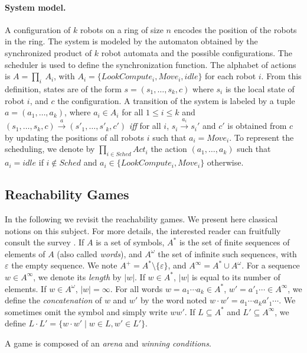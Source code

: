 \documentclass[envcountsame]{llncs} \usepackage[english]{babel}
\begin{document}
\paragraph {System model.}
A configuration of $k$ robots on a ring of size $n$ encodes the position of the robots in the ring.
The system is modeled by the automaton obtained
by the synchronized product of $k$ robot automata and the possible
configurations.   The scheduler
is used to define the synchronization function.   The alphabet of
actions is $A = {\prod_{i}}\ \mathit{A}_i$, with $A_i
= \{LookCompute_i, Move_i,idle\}$ for each robot $i$. From this definition, states
are of the form $s = (s_1,\dots,s_k,c)$ where $s_i$ is the local state
of robot $i$, and $c$ the configuration. A transition of the system is labeled by a tuple $a=(a_1, \ldots, a_k)$, where
$a_i \in A_i$ for all $1 \leq i \leq k$ and $(s_1,\dots,s_k,c) \xrightarrow{a}
(s'_1,\dots,s'_k,c')$ \textit{iff} for all $i$, $s_i \xrightarrow{a_i} s_i'$ and
$c'$ is obtained from $c$ by updating the positions of all robots $i$ such that
$a_i = Move_i$. To represent the scheduling, we denote by ${\prod_{i \in
\mathit{Sched}}} \mathit{Act}_i$ the action $(a_1, \ldots, a_k)$ such that $a_i
= idle$ if $i \notin Sched$ and $a_i \in \{LookCompute_i, Move_i\}$ otherwise.


\subsection{Reachability Games}
\label{sec:jeux}
In the following we revisit the reachability games. We present here classical notions on this subject.
For more details, the interested reader can fruitfully consult the survey \cite{DBLP:conf/dagstuhl/Mazala01}.
If $A$ is a set of symbols, $A^*$ is the set of finite sequences of elements of $A$ (also called \emph{words}), and $A^\omega$
the set of infinite such sequences, with $\varepsilon$ the empty sequence. We note $A^+=A^*\setminus \{\varepsilon\}$,
and $A^\infty=A^*\cup A^\omega$. For a sequence $w\in A^\infty$, we denote its \emph{length} by $|w|$. If $w\in A^*$, $|w|$ is
equal to its number of elements. If $w\in A^\omega$, $|w|=\infty$.
For all words $w=a_1\cdots a_k\in A^*$, $w'=a'_1\cdots\in A^\infty$, we define the \emph{concatenation} of $w$ and $w'$ by the
word noted $w\cdot w'=a_1\cdots a_ka'_1\cdots$. We sometimes omit the symbol and simply write $ww'$. 
If $L\subseteq A^*$ and $L'\subseteq A^\infty$, we define $L\cdot L'=\{w\cdot w'\mid w\in L, w'\in L'\}$.

A game is composed of an \textit{arena} and \textit{winning conditions}.
\end{document}
